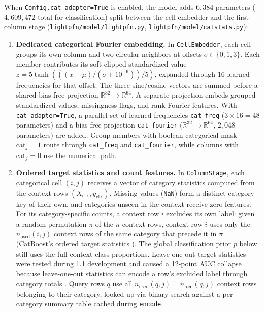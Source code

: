 \documentclass[11pt]{article}
\newcommand{\R}{\mathbb{R}}
\begin{document}
When \texttt{Config.cat\_adapter=True} is enabled, the model adds $6{,}384$ parameters ($4{,}609{,}472$ total for classification) split between the cell embedder and the first column stage (\texttt{lightpfn/model/lightpfn.py}, \texttt{lightpfn/model/catstats.py}): %
\begin{enumerate}
\item \textbf{Dedicated categorical Fourier embedding.}
In \texttt{CellEmbedder}, each cell groups its own column and two circular neighbors at offsets $o\in\{0,1,3\}$. Each member contributes its soft-clipped standardized value $z=5\tanh(((x-\mu)/(\sigma+10^{-6}))/5)$, expanded through 16 learned frequencies for that offset. The three sine/cosine vectors are summed before a shared bias-free projection $\R^{32}\to\R^{64}$. A separate projection embeds grouped standardized values, missingness flags, and rank Fourier features. %
With \texttt{cat\_adapter=True}, a parallel set of learned frequencies \texttt{cat\_freq} ($3\times16=48$ parameters) and a bias-free projection \texttt{cat\_fourier} ($\R^{32}\to\R^{64}$, $2{,}048$ parameters) are added. %
Group members with boolean categorical mask $\mathrm{cat}_j = 1$ route through \texttt{cat\_freq} and \texttt{cat\_fourier}, while columns with $\mathrm{cat}_j = 0$ use the numerical path.
\item \textbf{Ordered target statistics and count features.}
In \texttt{ColumnStage}, each categorical cell $(i,j)$ receives a vector of category statistics computed from the context rows $(X_{\text{ctx}}, y_{\text{ctx}})$. %
Missing values (\texttt{NaN}) form a distinct category key of their own, and categories unseen in the context receive zero features.
For its category-specific counts, a context row $i$ excludes its own label: given a random permutation $\pi$ of the $n$ context rows, context row $i$ uses only the $n_{\text{used}}(i,j)$ context rows of the same category that precede it in $\pi$ (CatBoost's ordered target statistics \cite{prokhorenkova2018}). The global classification prior $p$ below still uses the full context class proportions.
Leave-one-out target statistics were tested during 1.1 development and caused a 12-point AUC collapse because leave-one-out statistics can encode a row's excluded label through category totals \cite[Section~12]{ottoboni2026lightpfn}. %
Query rows $q$ use all $n_{\text{used}}(q,j) = n_{\text{freq}}(q,j)$ context rows belonging to their category, looked up via binary search against a per-category summary table cached during \texttt{encode}.


\end{enumerate}
\end{document}
